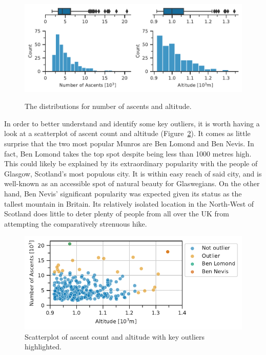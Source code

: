 \documentclass[11pt,a4paper]{article}
\begin{document}
\begin{figure} [h!]
    \centering
    \includegraphics{report/box_dist.pdf}
    \begin{minipage}[t]{.5\linewidth}
        \centering
        \label{fds-project-template:fig:box_dist_ascents}
    \end{minipage}%
    \begin{minipage}[t]{.5\linewidth}
        \centering
        \label{fds-project-template:fig:box_dist_altitude}
    \end{minipage}
    \caption{The distributions for number of ascents and altitude.}
      \label{fds-project-template:fig:box_dist}
\end{figure}
In order to better understand and identify some key outliers, it is worth having a look at a scatterplot of ascent count and altitude (Figure~\ref{fds-project-template:fig:scatterplot}). It comes as little surprise that the two most popular Munros are Ben Lomond and Ben Nevis. In fact, Ben Lomond takes the top spot despite being less than 1000 metres high. This could likely be explained by its extraordinary popularity with the people of Glasgow, Scotland's most populous city. It is within easy reach of said city, and is well-known as an accessible spot of natural beauty for Glaswegians. On the other hand, Ben Nevis' significant popularity was expected given its status as the tallest mountain in Britain. Its relatively isolated location in the North-West of Scotland does little to deter plenty of people from all over the UK from attempting the comparatively strenuous hike.
\begin{figure} [h!]
  \centering
  \includegraphics{report/scatterplot.pdf}
  \caption{Scatterplot of ascent count and altitude with key outliers highlighted.}
  \label{fds-project-template:fig:scatterplot}
\end{figure}
\end{document}
